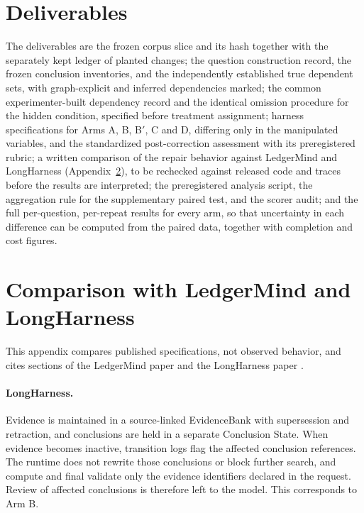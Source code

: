 \documentclass[11pt]{article}
\begin{document}
\section{Deliverables}\label{sec:deliverables}

The deliverables are the frozen corpus slice and its hash together with the separately kept ledger of planted changes; the question construction record, the frozen conclusion inventories, and the independently established true dependent sets, with graph-explicit and inferred dependencies marked; the common experimenter-built dependency record and the identical omission procedure for the hidden condition, specified before treatment assignment; harness specifications for Arms A, B, B$'$, C and D, differing only in the manipulated variables, and the standardized post-correction assessment with its preregistered rubric; a written comparison of the repair behavior against LedgerMind and LongHarness (Appendix~\ref{app:comparison}), to be rechecked against released code and traces before the results are interpreted; the preregistered analysis script, the aggregation rule for the supplementary paired test, and the scorer audit; and the full per-question, per-repeat results for every arm, so that uncertainty in each difference can be computed from the paired data, together with completion and cost figures.


\appendix
\section{Comparison with LedgerMind and LongHarness}\label{app:comparison}

This appendix compares published specifications, not observed behavior, and cites sections of the LedgerMind paper \cite{du2026ledgermind} and the LongHarness paper \cite{huang2026longharness}.

\paragraph{LongHarness.} Evidence is maintained in a source-linked EvidenceBank with supersession and retraction, and conclusions are held in a separate Conclusion State. When evidence becomes inactive, transition logs flag the affected conclusion references. The runtime does not rewrite those conclusions or block further search, and compute and final validate only the evidence identifiers declared in the request. Review of affected conclusions is therefore left to the model. This corresponds to Arm B.
\end{document}
